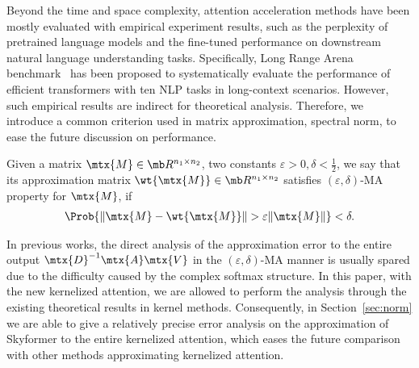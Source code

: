 Beyond the time and space complexity, attention acceleration methods have been mostly evaluated with empirical experiment results, such as the perplexity of pretrained language models and the fine-tuned performance on downstream natural language understanding tasks. 
Specifically, Long Range Arena benchmark~\citep{DBLP:journals/corr/abs-2011-04006} has been proposed to systematically evaluate the performance of efficient transformers with ten NLP tasks in long-context scenarios.
However, such empirical results are indirect for theoretical analysis.
Therefore, we introduce a common criterion used in matrix approximation, spectral norm, to ease the future discussion on performance.
\begin{definition}
\label{def:ma}
Given a matrix $\mtx{M} \in \mb R^{n_1 \times n_2}$, two constants $\varepsilon > 0, \delta < \frac12$, we say that its approximation matrix $\wt{\mtx{M}} \in \mb R^{n_1 \times n_2}$ satisfies $(\varepsilon, \delta)$-MA property for $\mtx{M}$, if
\begin{align}
\Prob{\|\mtx{M} - \wt{\mtx{M}}\| > \varepsilon \|\mtx{M}\|} < \delta.
\end{align}
\end{definition}

In previous works, the direct analysis of the approximation error to the entire output $\mtx{D}^{-1} \mtx{A} \mtx{V}$ in the $(\varepsilon, \delta)$-MA manner is usually spared due to the difficulty caused by the complex softmax structure.
In this paper, with the new kernelized attention, we are allowed to perform the analysis through the existing theoretical results in kernel methods.
Consequently, in Section~\ref{sec:norm} we are able to give a relatively precise error analysis on the approximation of Skyformer to the entire kernelized attention,
which eases the future comparison with other methods approximating kernelized attention.
